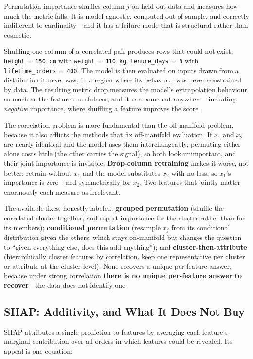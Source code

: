 Permutation importance shuffles column $j$ on held-out data and measures how much the metric falls. It is model-agnostic, computed out-of-sample, and correctly indifferent to cardinality---and it has a failure mode that is structural rather than cosmetic.

Shuffling one column of a correlated pair produces rows that could not exist: \texttt{height = 150\,cm} with \texttt{weight = 110\,kg}, \texttt{tenure\_days = 3} with \texttt{lifetime\_orders = 400}. The model is then evaluated on inputs drawn from a distribution it never saw, in a region where its behaviour was never constrained by data. The resulting metric drop measures the model's extrapolation behaviour as much as the feature's usefulness, and it can come out anywhere---including \emph{negative} importance, where shuffling a feature improves the score.

The correlation problem is more fundamental than the off-manifold problem, because it also afflicts the methods that fix off-manifold evaluation. If $x_1$ and $x_2$ are nearly identical and the model uses them interchangeably, permuting either alone costs little (the other carries the signal), so both look unimportant, and their joint importance is invisible. \textbf{Drop-column retraining} makes it worse, not better: retrain without $x_1$ and the model substitutes $x_2$ with no loss, so $x_1$'s importance is zero---and symmetrically for $x_2$. Two features that jointly matter enormously each measure as irrelevant.

The available fixes, honestly labeled: \textbf{grouped permutation} (shuffle the correlated cluster together, and report importance for the cluster rather than for its members); \textbf{conditional permutation} (resample $x_j$ from its conditional distribution given the others, which stays on-manifold but changes the question to ``given everything else, does this add anything''); and \textbf{cluster-then-attribute} (hierarchically cluster features by correlation, keep one representative per cluster or attribute at the cluster level). None recovers a unique per-feature answer, because under strong correlation \textbf{there is no unique per-feature answer to recover}---the data does not identify one.

\subsection{SHAP: Additivity, and What It Does Not Buy}

SHAP attributes a single prediction to features by averaging each feature's marginal contribution over all orders in which features could be revealed. Its appeal is one equation:

